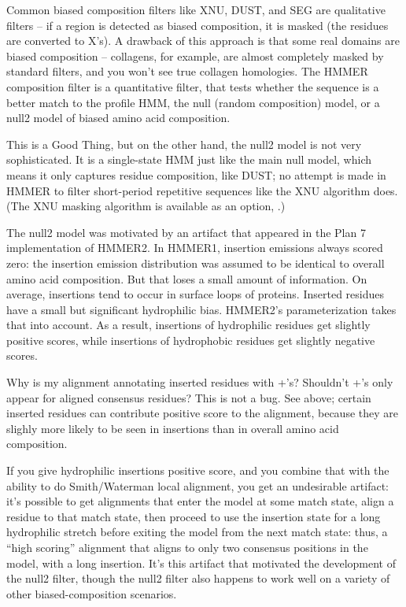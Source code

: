 Common biased composition filters like XNU, DUST, and SEG are
qualitative filters -- if a region is detected as biased composition,
it is masked (the residues are converted to X's). A drawback of this
approach is that some real domains are biased composition --
collagens, for example, are almost completely masked by standard
filters, and you won't see true collagen homologies.  The HMMER
composition filter is a quantitative filter, that tests whether the
sequence is a better match to the profile HMM, the null (random
composition) model, or a null2 model of biased amino acid composition.

This is a Good Thing, but on the other hand, the null2 model is not
very sophisticated. It is a single-state HMM just like the main null
model, which means it only captures residue composition, like DUST; no
attempt is made in HMMER to filter short-period repetitive sequences
like the XNU algorithm does. (The XNU masking algorithm is available
as an option, .)

The null2 model was motivated by an artifact that appeared in the Plan
7 implementation of HMMER2. In HMMER1, insertion emissions always
scored zero: the insertion emission distribution was assumed to be
identical to overall amino acid composition. But that loses a small
amount of information. On average, insertions tend to occur in surface
loops of proteins. Inserted residues have a small but significant
hydrophilic bias. HMMER2's parameterization takes that into account.
As a result, insertions of hydrophilic residues get slightly positive
scores, while insertions of hydrophobic residues get slightly negative
scores.

\begin{srefaq}{Why is my alignment annotating inserted residues with
+'s? Shouldn't +'s only appear for aligned consensus residues?} This
is not a bug. See above; certain inserted residues can contribute
positive score to the alignment, because they are slighly more likely
to be seen in insertions than in overall amino acid composition.
\end{srefaq}

If you give hydrophilic insertions positive score, and you combine
that with the ability to do Smith/Waterman local alignment, you get an
undesirable artifact: it's possible to get alignments that enter the
model at some match state, align a residue to that match state, then
proceed to use the insertion state for a long hydrophilic stretch
before exiting the model from the next match state: thus, a ``high
scoring'' alignment that aligns to only two consensus positions in the
model, with a long insertion. It's this artifact that motivated the
development of the null2 filter, though the null2 filter also happens
to work well on a variety of other biased-composition scenarios.


